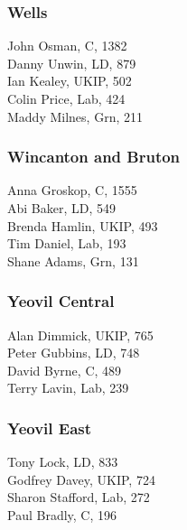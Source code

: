 \documentclass[a4paper,openany,10pt]{book}
\begin{document}
\subsubsection*{Wells}



John Osman, C, 1382\\
Danny Unwin, LD, 879\\
Ian Kealey, UKIP, 502\\
Colin Price, Lab, 424\\
Maddy Milnes, Grn, 211\\


\subsubsection*{Wincanton and Bruton}



Anna Groskop, C, 1555\\
Abi Baker, LD, 549\\
Brenda Hamlin, UKIP, 493\\
Tim Daniel, Lab, 193\\
Shane Adams, Grn, 131\\


\subsubsection*{Yeovil Central}



Alan Dimmick, UKIP, 765\\
Peter Gubbins, LD, 748\\
David Byrne, C, 489\\
Terry Lavin, Lab, 239\\


\subsubsection*{Yeovil East}



Tony Lock, LD, 833\\
Godfrey Davey, UKIP, 724\\
Sharon Stafford, Lab, 272\\
Paul Bradly, C, 196\\
\end{document}
